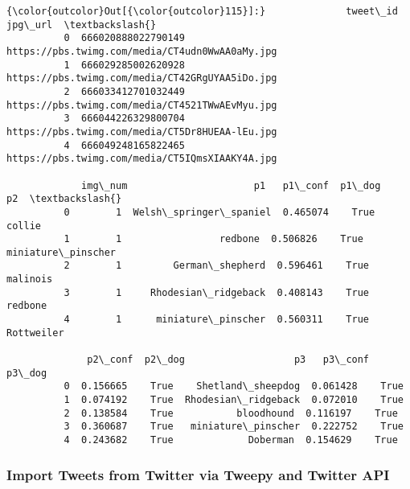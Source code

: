 \documentclass[11pt]{article}
\begin{document}
\begin{Verbatim}[commandchars=\\\{\}]
{\color{outcolor}Out[{\color{outcolor}115}]:}              tweet\_id                                          jpg\_url  \textbackslash{}
          0  666020888022790149  https://pbs.twimg.com/media/CT4udn0WwAA0aMy.jpg   
          1  666029285002620928  https://pbs.twimg.com/media/CT42GRgUYAA5iDo.jpg   
          2  666033412701032449  https://pbs.twimg.com/media/CT4521TWwAEvMyu.jpg   
          3  666044226329800704  https://pbs.twimg.com/media/CT5Dr8HUEAA-lEu.jpg   
          4  666049248165822465  https://pbs.twimg.com/media/CT5IQmsXIAAKY4A.jpg   
          
             img\_num                      p1   p1\_conf  p1\_dog                  p2  \textbackslash{}
          0        1  Welsh\_springer\_spaniel  0.465074    True              collie   
          1        1                 redbone  0.506826    True  miniature\_pinscher   
          2        1         German\_shepherd  0.596461    True            malinois   
          3        1     Rhodesian\_ridgeback  0.408143    True             redbone   
          4        1      miniature\_pinscher  0.560311    True          Rottweiler   
          
              p2\_conf  p2\_dog                   p3   p3\_conf  p3\_dog  
          0  0.156665    True    Shetland\_sheepdog  0.061428    True  
          1  0.074192    True  Rhodesian\_ridgeback  0.072010    True  
          2  0.138584    True           bloodhound  0.116197    True  
          3  0.360687    True   miniature\_pinscher  0.222752    True  
          4  0.243682    True             Doberman  0.154629    True  
\end{Verbatim}
            
    \subsubsection{Import Tweets from Twitter via Tweepy and Twitter
API}\label{import-tweets-from-twitter-via-tweepy-and-twitter-api}
\end{document}
